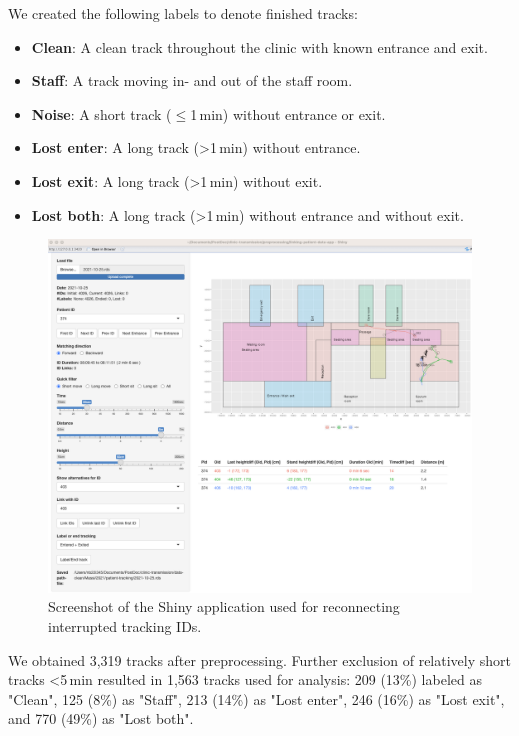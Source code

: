\documentclass[fleqn,11pt]{wlscirep_supp}
\begin{document}
We created the following labels to denote finished tracks: 
\begin{itemize}
    \item \textbf{Clean}: A clean track throughout the clinic with known entrance and exit.
    \item \textbf{Staff}: A track moving in- and out of the staff room.
    \item \textbf{Noise}: A short track ($\leq$1\,min) without entrance or exit.
    \item \textbf{Lost enter}: A long track (>1\,min) without entrance.
    \item \textbf{Lost exit}: A long track (>1\,min) without exit.
    \item \textbf{Lost both}: A long track (>1\,min) without entrance and without exit.
\end{itemize}

\begin{figure}[!htpb]
    \centering
    \includegraphics[width=\linewidth]{doc/paper/shiny-tool-screenshot.png}
    \caption{Screenshot of the Shiny application used for reconnecting interrupted tracking IDs.}
    \label{fig:shiny-app}
\end{figure}

We obtained 3,319 tracks after preprocessing. Further exclusion of relatively short tracks <5\,min resulted in 1,563 tracks used for analysis: 209 (13\%) labeled as "Clean", 125 (8\%) as "Staff", 213 (14\%) as "Lost enter", 246 (16\%) as "Lost exit", and 770 (49\%) as "Lost both". 
\end{document}
